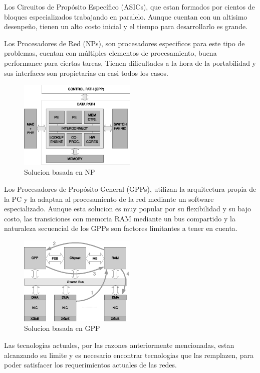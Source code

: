 Los Circuitos de Propósito Específico (ASICs), que estan formados por cientos de bloques especializados trabajando en paralelo. Aunque cuentan con un altisimo desenpeño, tienen un alto costo inicial y el tiempo para desarrollarlo es grande.

Los Procesadores de Red (NPs), son procesadores especificos para este tipo de problemas, cuentan con múltiples elementos de procesamiento, buena performance para ciertas tareas, Tienen dificultades a la hora de la portabilidad y sus interfaces son propietarias en casi todos los casos.
\begin{figure}[h]
  \centering
      \includegraphics[width=0.5\textwidth]{1-introduccion/graf/NP_based.eps}
  \caption{Solucion basada en NP}
  \label{fig:diseno}
\end{figure}
\newpage

Los Procesadores de Propósito General (GPPs), utilizan la arquitectura propia de la PC y la adaptan al procesamiento de la red mediante un software especializado. Aunque esta solucion es muy popular por su flexibilidad y su bajo costo, las transiciones con memoria RAM mediante un bus compartido y la naturaleza secuencial de los GPPs son factores limitantes a tener en cuenta. 
 \begin{figure}[h]
  \centering
      \includegraphics[width=0.5\textwidth]{1-introduccion/graf/GPP_based.eps}
  \caption{Solucion basada en GPP}
  \label{fig:diseno}
\end{figure}

Las tecnologias actuales, por las razones anteriormente mencionadas, estan alcanzando su limite y es necesario encontrar tecnologias que las remplazen, para poder satisfacer los requerimientos actuales de las redes. 

